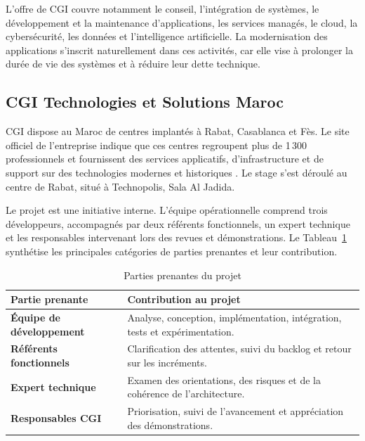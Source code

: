 L'offre de CGI couvre notamment le conseil, l'intégration de systèmes, le développement et la maintenance d'applications, les services managés, le cloud, la cybersécurité, les données et l'intelligence artificielle. La modernisation des applications s'inscrit naturellement dans ces activités, car elle vise à prolonger la durée de vie des systèmes et à réduire leur dette technique.

\subsection{CGI Technologies et Solutions Maroc}

CGI dispose au Maroc de centres implantés à Rabat, Casablanca et Fès. Le site officiel de l'entreprise indique que ces centres regroupent plus de 1\,300 professionnels et fournissent des services applicatifs, d'infrastructure et de support sur des technologies modernes et historiques \cite{cgi-maroc}. Le stage s'est déroulé au centre de Rabat, situé à Technopolis, Sala Al Jadida.

Le projet est une initiative interne. L'équipe opérationnelle comprend trois développeurs, accompagnés par deux référents fonctionnels, un expert technique et les responsables intervenant lors des revues et démonstrations. Le Tableau~\ref{tab:parties-prenantes-ch1} synthétise les principales catégories de parties prenantes et leur contribution.

\begin{table}[H]
    \centering
    \caption{Parties prenantes du projet}
    \label{tab:parties-prenantes-ch1}
    \small
    \begin{tabularx}{\textwidth}{|>{\bfseries\RaggedRight\arraybackslash}p{4cm}|>{\RaggedRight\arraybackslash}X|}
        \hline
        \rowcolor{cgilight!95}
        \textbf{Partie prenante} & \textbf{Contribution au projet} \\
        \hline
        Équipe de développement & Analyse, conception, implémentation, intégration, tests et expérimentation. \\
        \hline
        Référents fonctionnels & Clarification des attentes, suivi du backlog et retour sur les incréments. \\
        \hline
        Expert technique & Examen des orientations, des risques et de la cohérence de l'architecture. \\
        \hline
        Responsables CGI & Priorisation, suivi de l'avancement et appréciation des démonstrations. \\
        \hline
    \end{tabularx}
\end{table}


